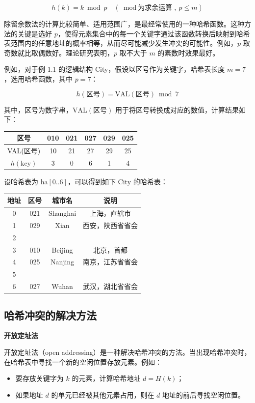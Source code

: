 \documentclass[lang=cn,newtx,10pt,scheme=chinese]{elegantbook}
\begin{document}
\[
h(k) = k \bmod p \quad (\bmod \text{为求余运算},\ p \leq m)
\]

除留余数法的计算比较简单、适用范围广，是最经常使用的一种哈希函数。这种方法的关键是选好 $p$，使得元素集合中的每一个关键字通过该函数转换后映射到哈希表范围内的任意地址的概率相等，从而尽可能减少发生冲突的可能性。例如，$p$ 取奇数就比取偶数好。理论研究表明，$p$ 取不大于 $m$ 的素数时效果最好。

例如，对于例 1.1 的逻辑结构 City，假设以区号作为关键字，哈希表长度 $m=7$，选用哈希函数，其中 $p=7$：

\[
h(\text{区号}) = \text{VAL}(\text{区号}) \bmod 7
\]

其中，区号为数字串，$\text{VAL}(\text{区号})$ 用于将区号转换成对应的数值，计算结果如下：

\begin{center}
\begin{tabular}{|c|c|c|c|c|c|}
\hline
区号 & 010 & 021 & 027 & 029 & 025 \\
\hline
VAL(区号) & 10 & 21 & 27 & 29 & 25 \\
\hline
$h(\text{key})$ & 3 & 0 & 6 & 1 & 4 \\
\hline
\end{tabular}
\end{center}

设哈希表为 $\text{ha}[0..6]$，可以得到如下 City 的哈希表：

\begin{center}
\begin{tabular}{|c|c|c|c|}
\hline
地址 & 区号 & 城市名 & 说明 \\
\hline
0 & 021 & Shanghai & 上海，直辖市 \\
1 & 029 & Xian     & 西安，陕西省省会 \\
2 &      &          & \\
3 & 010 & Beijing  & 北京，首都 \\
4 & 025 & Nanjing  & 南京，江苏省省会 \\
5 &      &          & \\
6 & 027 & Wuhan    & 武汉，湖北省省会 \\
\hline
\end{tabular}
\end{center}

\subsection{哈希冲突的解决方法}
\textbf{开放定址法}

开放定址法（open addressing）是一种解决哈希冲突的方法。当出现哈希冲突时，在哈希表中寻找一个新的空闲位置存放元素。例如：
\begin{itemize}
  \item 要存放关键字为 $k$ 的元素，计算哈希地址 $d = H(k)$；
  \item 如果地址 $d$ 的单元已经被其他元素占用，则在 $d$ 地址的前后寻找空闲位置。
\end{itemize}
\end{document}
